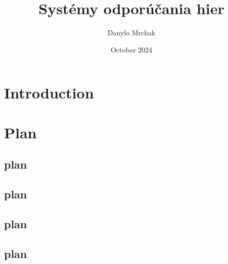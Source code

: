 \documentclass{article}
\title{Systémy odporúčania hier}
\author{Danylo Mrchak}
\date{October 2024}
\begin{document}
\maketitle

\section{Introduction}
\section{Plan}
\subsection{plan}
\subsection{plan}
\subsection{plan}
\subsection{plan}
\end{document}
